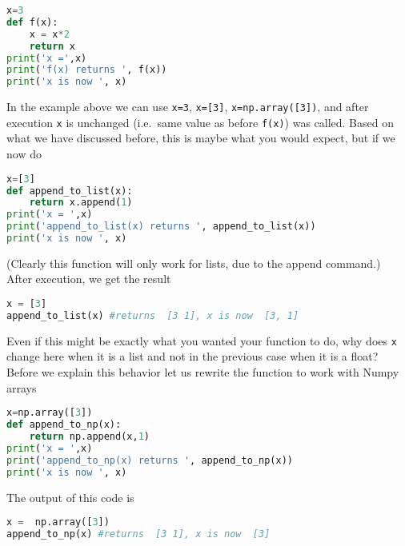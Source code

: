 \documentclass[graybox,sectrefs,envcountresetchap,open=right,final]{svmonodo}
\begin{document}
\begin{lstlisting}[language=python,style=blue1bar]
x=3
def f(x):
    x = x*2
    return x
print('x =',x)
print('f(x) returns ', f(x))
print('x is now ', x)

\end{lstlisting}

In the example above we can use \texttt{x=3}, \texttt{x=[3]}, \texttt{x=np.array([3])}, and after execution \texttt{x} is unchanged (i.e.~same value as before \texttt{f(x)}) was called. Based on what we have discussed before, this is maybe what you would expect, but if we now do







\begin{lstlisting}[language=python,style=blue1bar]
x=[3]
def append_to_list(x):
    return x.append(1)
print('x = ',x)
print('append_to_list(x) returns ', append_to_list(x))
print('x is now ', x)

\end{lstlisting}

(Clearly this function will only work for lists, due to the append command.) After execution, we get the result



\begin{lstlisting}[language=python,style=blue1bar]
x = [3]
append_to_list(x) #returns  [3 1], x is now  [3, 1]

\end{lstlisting}

Even if this might be exactly what you wanted your function to do, why does \texttt{x} change here when it is a list and not in the previous case when it is a float? Before we explain this behavior let us rewrite the function to work with Numpy arrays







\begin{lstlisting}[language=python,style=blue1bar]
x=np.array([3])
def append_to_np(x):
    return np.append(x,1)
print('x = ',x)
print('append_to_np(x) returns ', append_to_np(x))
print('x is now ', x)

\end{lstlisting}

The output of this code is



\begin{lstlisting}[language=python,style=blue1bar]
x =  np.array([3])
append_to_np(x) #returns  [3 1], x is now  [3]

\end{lstlisting}
\end{document}
